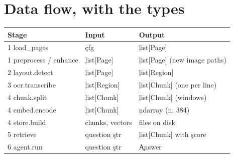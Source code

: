 \section{Data flow, with the types}
\begin{center}
\begin{tabular}{@{}lll@{}}
\toprule Stage & Input & Output \\ \midrule
1 load\_pages & \c{cfg} & \c{list[Page]} \\
1 preprocess / enhance & \c{list[Page]} & \c{list[Page]} (new image paths) \\
2 layout.detect & \c{list[Page]} & \c{list[Region]} \\
3 ocr.transcribe & \c{list[Region]} & \c{list[Chunk]} (one per line) \\
4 chunk.split & \c{list[Chunk]} & \c{list[Chunk]} (windows) \\
4 embed.encode & \c{list[Chunk]} & \c{ndarray (n, 384)} \\
4 store.build & chunks, vectors & files on disk \\
5 retrieve & question \c{str} & \c{list[Chunk]} with \c{score} \\
6 agent.run & question \c{str} & \c{Answer} \\
\bottomrule
\end{tabular}
\end{center}

